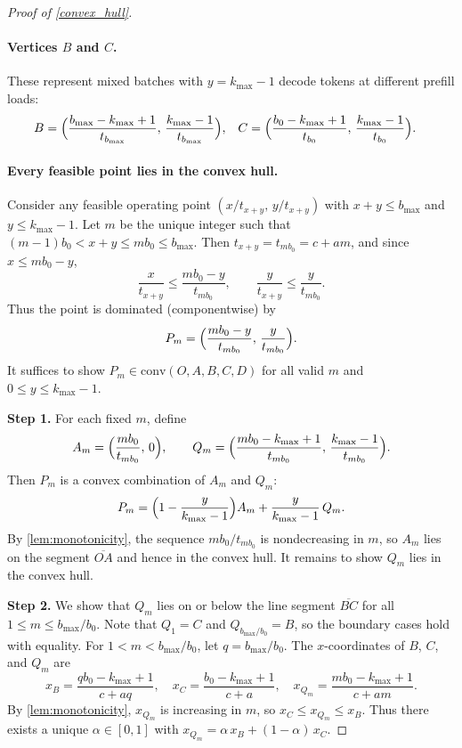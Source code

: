 \documentclass[11pt]{article}
\theoremstyle{plain}
\theoremstyle{definition}
\theoremstyle{remark}
\begin{document}
\begin{proof}[Proof of \cref{convex_hull}]
\paragraph{Vertices $B$ and $C$.} These represent mixed batches with \( y = k_{\max} - 1 \) decode tokens at different prefill loads:
\begin{align*}
    B &= \Bigl(\frac{b_{\max} - k_{\max} + 1}{t_{b_{\max}}},\, \frac{k_{\max} - 1}{t_{b_{\max}}}\Bigr), &
    C &= \Bigl(\frac{b_0 - k_{\max} + 1}{t_{b_0}},\, \frac{k_{\max} - 1}{t_{b_0}}\Bigr).
\end{align*}

\paragraph{Every feasible point lies in the convex hull.}
Consider any feasible operating point \( (x/t_{x+y},\, y/t_{x+y}) \) with \( x + y \le b_{\max} \) and \( y \le k_{\max} - 1 \). Let \( m \) be the unique integer such that \( (m-1)b_0 < x + y \le m b_0 \le b_{\max} \). Then \( t_{x+y} = t_{m b_0} = c + am \), and since \( x \le m b_0 - y \),
\[
\frac{x}{t_{x+y}} \le \frac{m b_0 - y}{t_{m b_0}}, \qquad \frac{y}{t_{x+y}} \le \frac{y}{t_{m b_0}}.
\]
Thus the point is dominated (componentwise) by
\[
P_m = \Bigl( \frac{m b_0 - y}{t_{m b_0}},\, \frac{y}{t_{m b_0}} \Bigr).
\]
It suffices to show \( P_m \in \mathrm{conv}(O, A, B, C, D) \) for all valid \( m \) and \( 0 \le y \le k_{\max} - 1 \).

\textbf{Step 1.} For each fixed \( m \), define
\[
A_m = \Bigl( \frac{m b_0}{t_{m b_0}},\, 0 \Bigr), \qquad Q_m = \Bigl( \frac{m b_0 - k_{\max} + 1}{t_{m b_0}},\, \frac{k_{\max} - 1}{t_{m b_0}} \Bigr).
\]
Then \( P_m \) is a convex combination of \( A_m \) and \( Q_m \):
\[
P_m = \Bigl(1 - \frac{y}{k_{\max} - 1}\Bigr) A_m + \frac{y}{k_{\max} - 1}\, Q_m.
\]
By \cref{lem:monotonicity}, the sequence \( m b_0 / t_{m b_0} \) is nondecreasing in \( m \), so \( A_m \) lies on the segment \( \overline{OA} \) and hence in the convex hull. It remains to show \( Q_m \) lies in the convex hull.

\textbf{Step 2.} We show that \( Q_m \) lies on or below the line segment \( \overline{BC} \) for all \( 1 \le m \le b_{\max}/b_0 \). Note that \( Q_1 = C \) and \( Q_{b_{\max}/b_0} = B \), so the boundary cases hold with equality. For \( 1 < m < b_{\max}/b_0 \), let \( q = b_{\max}/b_0 \). The \( x \)-coordinates of \( B \), \( C \), and \( Q_m \) are
\[
x_B = \frac{q b_0 - k_{\max} + 1}{c + aq}, \quad x_C = \frac{b_0 - k_{\max} + 1}{c + a}, \quad x_{Q_m} = \frac{m b_0 - k_{\max} + 1}{c + am}.
\]
By \cref{lem:monotonicity}, \( x_{Q_m} \) is increasing in \( m \), so \( x_C \le x_{Q_m} \le x_B \). Thus there exists a unique \( \alpha \in [0,1] \) with \( x_{Q_m} = \alpha\, x_B + (1 - \alpha)\, x_C \).


\end{proof}
\end{document}
